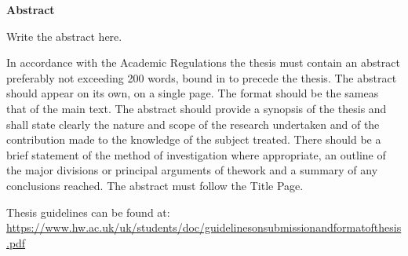 \begin{center}
\LARGE\textbf {Abstract}
\end{center}
\vspace{1cm}

\begin{spacing}{1} 
\noindent
Write the abstract here.

In accordance with the Academic Regulations the thesis must contain an abstract preferably not exceeding 200 words, bound in to precede the thesis. The abstract should appear on its own, on a single page.  The format should be the sameas that of the main text. The abstract should provide a synopsis of the thesis and shall state clearly the nature and scope of the research undertaken and of the contribution made to the knowledge of the subject treated. There should be a brief statement of the method of investigation where appropriate, an outline of the major divisions or principal arguments of thework and a summary of any conclusions reached. The abstract must follow the Title Page.

Thesis guidelines can be found at: \\ \url{https://www.hw.ac.uk/uk/students/doc/guidelinesonsubmissionandformatofthesis.pdf }

\end{spacing}